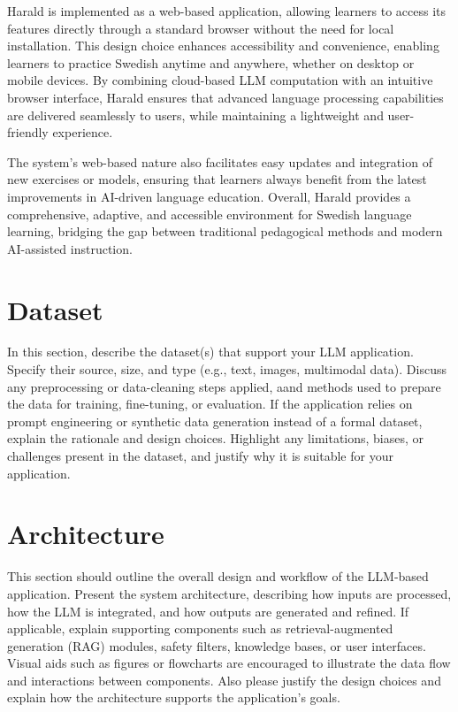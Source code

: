 \documentclass[a4paper,10pt]{article}
\begin{document}
Harald is implemented as a web-based application, allowing learners to access its features directly through a standard browser without the need for local installation. This design choice enhances accessibility and convenience, enabling learners to practice Swedish anytime and anywhere, whether on desktop or mobile devices. By combining cloud-based LLM computation with an intuitive browser interface, Harald ensures that advanced language processing capabilities are delivered seamlessly to users, while maintaining a lightweight and user-friendly experience.

The system’s web-based nature also facilitates easy updates and integration of new exercises or models, ensuring that learners always benefit from the latest improvements in AI-driven language education. Overall, Harald provides a comprehensive, adaptive, and accessible environment for Swedish language learning, bridging the gap between traditional pedagogical methods and modern AI-assisted instruction.


\section{Dataset}
In this section, describe the dataset(s) that support your LLM application. Specify their source, size, and type (e.g., text, images, multimodal data). Discuss any preprocessing or data-cleaning steps applied, aand methods used to prepare the data for training, fine-tuning, or evaluation. If the application relies on prompt engineering or synthetic data generation instead of a formal dataset, explain the rationale and design choices. Highlight any limitations, biases, or challenges present in the dataset, and justify why it is suitable for your application.

\section{Architecture}
This section should outline the overall design and workflow of the LLM-based application. Present the system architecture, describing how inputs are processed, how the LLM is integrated, and how outputs are generated and refined. If applicable, explain supporting components such as retrieval-augmented generation (RAG) modules, safety filters, knowledge bases, or user interfaces. Visual aids such as figures or flowcharts are encouraged to illustrate the data flow and interactions between components. Also please justify the design choices and explain how the architecture supports the application's goals.
\end{document}

